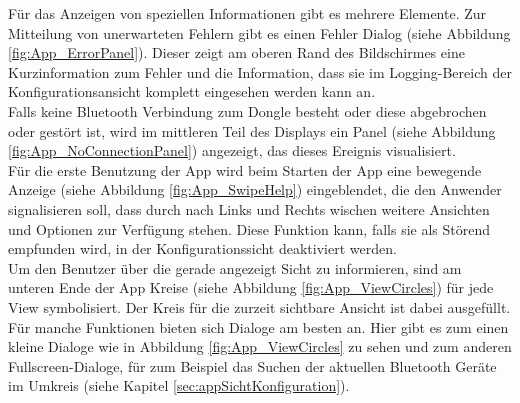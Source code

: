 Für das Anzeigen von speziellen Informationen gibt es mehrere Elemente. Zur Mitteilung von unerwarteten Fehlern gibt es einen Fehler Dialog (siehe Abbildung \ref{fig:App_ErrorPanel}). Dieser zeigt am oberen Rand des Bildschirmes eine Kurzinformation zum Fehler und die Information, dass sie im Logging-Bereich der Konfigurationsansicht komplett eingesehen werden kann an.
\\
Falls keine Bluetooth Verbindung zum Dongle besteht oder diese abgebrochen oder gestört ist, wird im mittleren Teil des Displays ein Panel (siehe Abbildung \ref{fig:App_NoConnectionPanel}) angezeigt, das dieses Ereignis visualisiert.
\\
Für die erste Benutzung der App wird beim Starten der App eine bewegende Anzeige (siehe Abbildung \ref{fig:App_SwipeHelp}) eingeblendet, die den Anwender signalisieren soll, dass durch nach Links und Rechts wischen weitere Ansichten und Optionen zur Verfügung stehen. Diese Funktion kann, falls sie als Störend empfunden wird, in der Konfigurationssicht deaktiviert werden.
\\
Um den Benutzer über die gerade angezeigt Sicht zu informieren, sind am unteren Ende der App Kreise (siehe Abbildung \ref{fig:App_ViewCircles}) für jede View symbolisiert. Der Kreis für die zurzeit sichtbare Ansicht ist dabei ausgefüllt.
\\
Für manche Funktionen bieten sich Dialoge am besten an. Hier gibt es zum einen kleine Dialoge wie in Abbildung \ref{fig:App_ViewCircles} zu sehen und zum anderen Fullscreen-Dialoge, für zum Beispiel das Suchen der aktuellen Bluetooth Geräte im Umkreis (siehe Kapitel \ref{sec:appSichtKonfiguration}).






